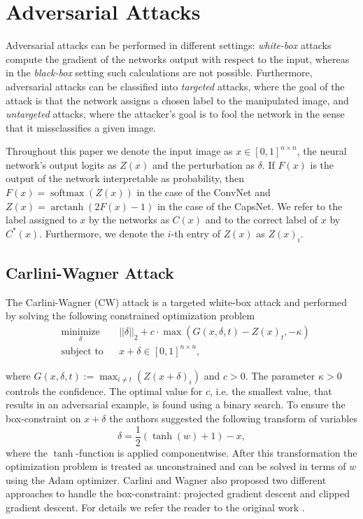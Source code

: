 \documentclass{article}
\DeclareMathOperator\arctanh{arctanh}
\DeclareMathOperator\softmax{softmax}
\begin{document}
\section{Adversarial Attacks}
\label{lab:attacks}

Adversarial attacks can be performed in different settings: 
\emph{white-box} attacks compute the gradient of the
networks output with respect to the input, whereas in the \emph{black-box}
setting such calculations are not possible. Furthermore, adversarial
attacks can be classified into \emph{targeted} attacks, where the goal of the
attack is that the network assigns a chosen label to the manipulated
image, and \emph{untargeted} attacks, where the attacker's goal is to fool
the network in the sense that it missclassifies a given image.

Throughout this paper we denote the input image as $x\in [0,1]^{n\times n}$, the neural network's output logits as $Z(x)$ and the perturbation as $\delta$. If $F(x)$ is the output of the network interpretable as probability, then
$F(x) = \softmax (Z(x))$ in the case of the ConvNet and $Z(x) = \arctanh(2F(x) - 1)$ in the case of the CapsNet. We refer to the label assigned to $x$ by the networks as $C(x)$  and to the correct label of $x$ by $C^*(x)$. Furthermore, we denote the $i$-th entry of $Z(x)$ as $Z(x)_i$.

\subsection{Carlini-Wagner Attack}

The Carlini-Wagner (CW) attack  is a targeted white-box attack and performed by solving the following constrained optimization problem
\begin{equation}
\begin{aligned}
& \underset{\delta}{\text{minimize}}
& & ||\delta||_2 + c \cdot \max(G(x,\delta,t)-Z(x)_t, -\kappa) \\
& \text{subject to}
& & x+\delta \in [0,1]^{n \times n},
\end{aligned}
\end{equation}

where $G(x,\delta,t) := \max_{i\neq t}(Z(x+\delta)_i)$ and $c>0$. The parameter  $\kappa > 0$ controls the confidence. The optimal value for $c$, i.e. the smallest value, that results in an adversarial example, is found using a binary search. To ensure the box-constraint on $x+\delta$ the authors suggested the following transform of variables 
\begin{equation}
\delta = \frac{1}{2}(\tanh(w)+1)-x,
\end{equation} 
where the $\tanh$-function is applied componentwise. After this
transformation the optimization problem is treated as unconstrained
and can be solved in terms of $w$ using the Adam
optimizer\cite{adam}. Carlini and Wagner  also proposed two
different approaches to handle the box-constraint: projected gradient
descent and clipped gradient descent. For details we refer the reader
to the original work \cite{carlini}.
\end{document}
